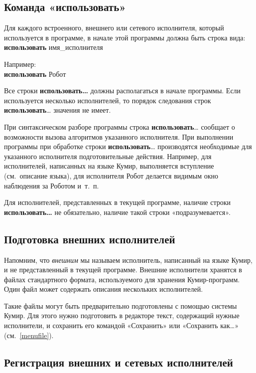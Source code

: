 \subsection{Команда «использовать»}
\label{use}

Для каждого встроенного, внешнего или сетевого исполнителя, который используется в программе, в начале этой программы должна быть строка вида:\\
\textsf{\textbf{использовать} имя\_исполнителя}

Например:\\
\textsf{\textbf{использовать} Робот}

Все строки \textsf{\textbf{использовать\dots}} должны располагаться в начале программы. Если используется несколько исполнителей, то порядок следования строк \textsf{\textbf{использовать}\dots} значения не имеет.

При синтаксическом разборе программы строка \textsf{\textbf{использовать}\dots} сообщает о возможности вызова алгоритмов указанного исполнителя. При выполнении программы при обработке строки \textsf{\textbf{использовать}\dots} производятся необходимые для указанного исполнителя подготовительные действия. Например, для исполнителей, написанных на языке Кумир, выполняется вступление (см.~описание языка), для исполнителя Робот делается видимым окно наблюдения за Роботом и~т.~п.

Для исполнителей, представленных в текущей программе, наличие строки \textsf{\textbf{использовать\dots}} не обязательно, наличие такой строки «подразумевается».

\subsection{Подготовка внешних исполнителей}

Напомним, что \emph{внешним} мы называем исполнитель, написанный на языке Кумир, и не представленный в текущей программе. Внешние исполнители хранятся в файлах стандартного формата, используемого для хранения Кумир-программ. Один файл может содержать описания нескольких исполнителей.

Такие файлы могут быть предварительно подготовлены с помощью системы Кумир. Для этого нужно подготовить в редакторе текст, содержащий нужные исполнители, и сохранить его командой «Сохранить» или «Сохранить как\dots» (см.~\ref{menufile}).

\subsection{Регистрация внешних и сетевых исполнителей}
\label{reg-isps}


